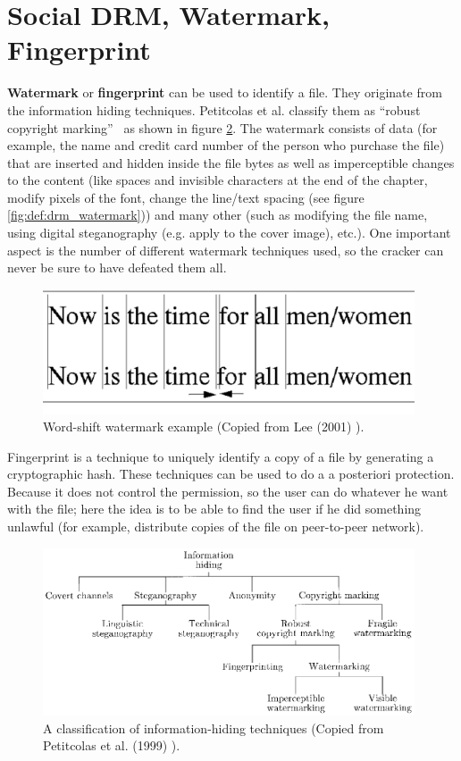 \documentclass[11pt,a4paper,oneside]{memoir}
\begin{document}
\section{Social DRM, Watermark, Fingerprint}

\textbf{Watermark} or \textbf{fingerprint} can be used to identify a file. They originate from the information hiding techniques. Petitcolas et al. classify them as \textquotedblleft robust copyright marking\textquotedblright ~\cite{ieee:info_hiding} as shown in figure \ref{fig:def:drm_finger}. The watermark\label{def:watermark} consists of data (for example, the name and credit card number of the person who purchase the file) that are inserted and hidden inside the file bytes as well as imperceptible changes to the content (like spaces and invisible characters at the end of the chapter, modify pixels of the font, change the line/text spacing (see figure \vref{fig:def:drm_watermark})) and many other (such as modifying the file name, using digital steganography (e.g. apply to the cover image), etc.). One important aspect is the number of different watermark techniques used, so the cracker can never be sure to have defeated them all.
\begin{figure}[h]
   \centering
   	\includegraphics[width=11cm]{watermark}
   \caption{Word-shift watermark example (Copied from Lee (2001) \cite{lee:watermark}).}
   \label{fig:def:drm_watermark}
\end{figure}

Fingerprint is a technique to uniquely identify a copy of a file by generating a cryptographic hash. These techniques can be used to do a a posteriori protection. Because it does not control the permission, so the user can do whatever he want with the file; here the idea is to be able to find the user if he did something unlawful (for example, distribute copies of the file on peer-to-peer network).
\begin{figure}[h]
   \centering
   	\includegraphics[width=11cm]{information_hiding}
   \caption{A classification of information-hiding techniques (Copied from Petitcolas et al. (1999) \cite{ieee:info_hiding}).}
   \label{fig:def:drm_finger}
\end{figure}
\end{document}

